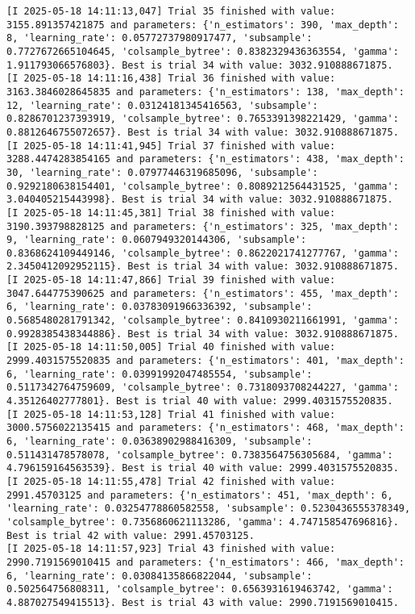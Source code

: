 \documentclass[
  letterpaper,
  DIV=11,
  numbers=noendperiod]{scrreprt}
\begin{document}
\begin{verbatim}
[I 2025-05-18 14:11:13,047] Trial 35 finished with value: 3155.891357421875 and parameters: {'n_estimators': 390, 'max_depth': 8, 'learning_rate': 0.05772737980917477, 'subsample': 0.7727672665104645, 'colsample_bytree': 0.8382329436363554, 'gamma': 1.911793066576803}. Best is trial 34 with value: 3032.910888671875.
[I 2025-05-18 14:11:16,438] Trial 36 finished with value: 3163.3846028645835 and parameters: {'n_estimators': 138, 'max_depth': 12, 'learning_rate': 0.03124181345416563, 'subsample': 0.8286701237393919, 'colsample_bytree': 0.7653391398221429, 'gamma': 0.8812646755072657}. Best is trial 34 with value: 3032.910888671875.
[I 2025-05-18 14:11:41,945] Trial 37 finished with value: 3288.4474283854165 and parameters: {'n_estimators': 438, 'max_depth': 30, 'learning_rate': 0.07977446319685096, 'subsample': 0.9292180638154401, 'colsample_bytree': 0.8089212564431525, 'gamma': 3.040405215443998}. Best is trial 34 with value: 3032.910888671875.
[I 2025-05-18 14:11:45,381] Trial 38 finished with value: 3190.393798828125 and parameters: {'n_estimators': 325, 'max_depth': 9, 'learning_rate': 0.0607949320144306, 'subsample': 0.8368624109449146, 'colsample_bytree': 0.8622021741277767, 'gamma': 2.3450412092952115}. Best is trial 34 with value: 3032.910888671875.
[I 2025-05-18 14:11:47,866] Trial 39 finished with value: 3047.644775390625 and parameters: {'n_estimators': 455, 'max_depth': 6, 'learning_rate': 0.03783091966336392, 'subsample': 0.5685480281791342, 'colsample_bytree': 0.8410930211661991, 'gamma': 0.9928385438344886}. Best is trial 34 with value: 3032.910888671875.
[I 2025-05-18 14:11:50,005] Trial 40 finished with value: 2999.4031575520835 and parameters: {'n_estimators': 401, 'max_depth': 6, 'learning_rate': 0.03991992047485554, 'subsample': 0.5117342764759609, 'colsample_bytree': 0.7318093708244227, 'gamma': 4.35126402777801}. Best is trial 40 with value: 2999.4031575520835.
[I 2025-05-18 14:11:53,128] Trial 41 finished with value: 3000.5756022135415 and parameters: {'n_estimators': 468, 'max_depth': 6, 'learning_rate': 0.03638902988416309, 'subsample': 0.511431478578078, 'colsample_bytree': 0.7383564756305684, 'gamma': 4.796159164563539}. Best is trial 40 with value: 2999.4031575520835.
[I 2025-05-18 14:11:55,478] Trial 42 finished with value: 2991.45703125 and parameters: {'n_estimators': 451, 'max_depth': 6, 'learning_rate': 0.03254778860582558, 'subsample': 0.5230436555378349, 'colsample_bytree': 0.7356860621113286, 'gamma': 4.747158547696816}. Best is trial 42 with value: 2991.45703125.
[I 2025-05-18 14:11:57,923] Trial 43 finished with value: 2990.7191569010415 and parameters: {'n_estimators': 466, 'max_depth': 6, 'learning_rate': 0.03084135866822044, 'subsample': 0.502564756808311, 'colsample_bytree': 0.6563931619463742, 'gamma': 4.887027549415513}. Best is trial 43 with value: 2990.7191569010415.

\end{verbatim}
\end{document}
